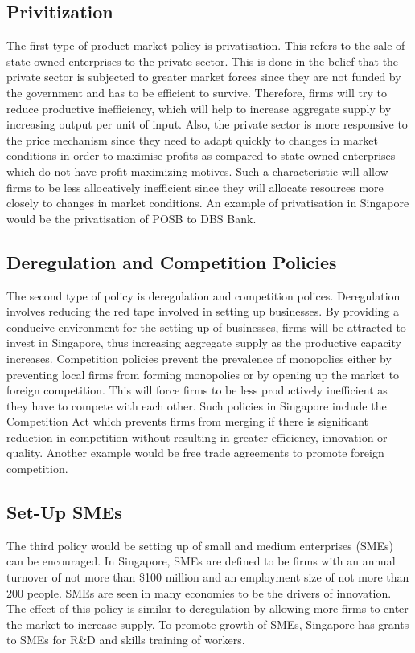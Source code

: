 \subsection{Privitization}
The first type of product market policy is privatisation. This refers to the sale of state-owned enterprises to the private sector. This is done in the belief that the private sector is subjected to greater market forces since they are not funded by the government and has to be efficient to survive. Therefore, firms will try to reduce productive inefficiency, which will help to increase aggregate supply by increasing output per unit of input. Also, the private sector is more responsive to the price mechanism since they need to adapt quickly to changes in market conditions in order to maximise profits as compared to state-owned enterprises which do not have profit maximizing motives. Such a characteristic will allow firms to be less allocatively inefficient since they will allocate resources more closely to changes in market conditions. An example of privatisation in Singapore would be the privatisation of POSB to DBS Bank.
\subsection{Deregulation and Competition Policies}
The second type of policy is deregulation and competition polices. Deregulation involves reducing the red tape involved in setting up businesses. By providing a conducive environment for the setting up of businesses, firms will be attracted to invest in Singapore, thus increasing aggregate supply as the productive capacity increases. Competition policies prevent the prevalence of monopolies either by preventing local firms from forming monopolies or by opening up the market to foreign competition. This will force firms to be less productively inefficient as they have to compete with each other. Such policies in Singapore include the Competition Act which prevents firms from merging if there is significant reduction in competition without resulting in greater efficiency, innovation or quality. Another example would be free trade agreements to promote foreign competition.
\subsection{Set-Up SMEs}
The third policy would be setting up of small and medium enterprises (SMEs) can be encouraged. In Singapore, SMEs are defined to be firms with an annual turnover of not more than \$100 million and an employment size of not more than 200 people. SMEs are seen in many economies to be the drivers of innovation. The effect of this policy is similar to deregulation by allowing more firms to enter the market to increase supply. To promote growth of SMEs, Singapore has grants to SMEs for R\&D and skills training of workers.
